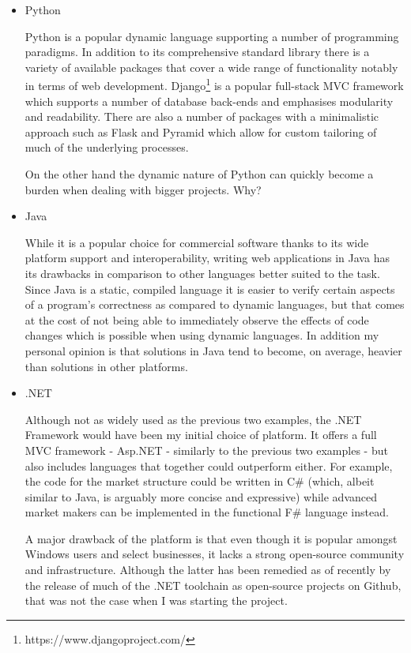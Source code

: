 \documentclass[bsc,frontabs,twoside,singlespacing,parskip,deptreport]{infthesis}     %
\begin{document}
\begin{itemize}
\item Python

Python is a popular dynamic language supporting a number of programming paradigms. In addition to its comprehensive standard library there is a variety of available packages that cover a wide range of functionality notably in terms of web development. Django\footnote{https://www.djangoproject.com/} is a popular full-stack MVC framework which supports a number of database back-ends and emphasises modularity and readability. There are also a number of packages with a minimalistic approach such as Flask and Pyramid which allow for custom tailoring of much of the underlying processes.

On the other hand the dynamic nature of Python can quickly become a burden when dealing with bigger projects. Why?

\item Java

While it is a popular choice for commercial software thanks to its wide platform support and interoperability, writing web applications in Java has its drawbacks in comparison to other languages better suited to the task. Since Java is a static, compiled language it is easier to verify certain aspects of a program's correctness as compared to dynamic languages, but that comes at the cost of not being able to immediately observe the effects of code changes which is possible when using dynamic languages. In addition my personal opinion is that solutions in Java tend to become, on average, heavier than solutions in other platforms.

\item .NET

    Although not as widely used as the previous two examples, the .NET Framework would have been my initial choice of platform. It offers a full MVC framework - Asp.NET -  similarly to the previous two examples - but also includes languages that together could outperform either. For example, the code for the market structure could be written in C\# (which, albeit similar to Java, is arguably more concise and expressive) while advanced market makers can be implemented in the functional F\# language instead.

    A major drawback of the platform is that even though it is popular amongst Windows users and select businesses, it lacks a strong open-source community and infrastructure. Although the latter has been remedied as of recently by the release of much of the .NET toolchain as open-source projects on Github, that was not the case when I was starting the project.

\end{itemize}
\end{document}

